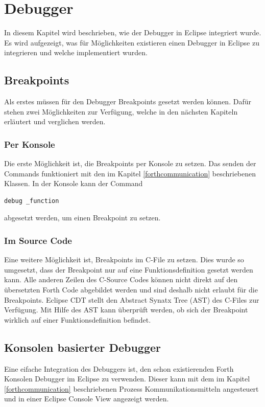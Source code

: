 \chapter{Debugger}
\label{chap:debugger}
In diesem Kapitel wird beschrieben, wie der Debugger in Eclipse integriert wurde. Es wird aufgezeigt, was für Möglichkeiten existieren einen Debugger in Eclipse zu integrieren und welche implementiert wurden.

\section{Breakpoints}
Als erstes müssen für den Debugger Breakpoints gesetzt werden können. Dafür stehen zwei Möglichkeiten zur Verfügung, welche in den nächsten Kapiteln erläutert und verglichen werden.

\subsection{Per Konsole}

Die erste Möglichkeit ist, die Breakpoints per Konsole zu setzen. Das senden der Commands funktioniert mit den im Kapitel \ref{forthcommunication} beschriebenen Klassen. In der Konsole kann der Command

%
\begin{verbatim}
debug _function
\end{verbatim}
%
abgesetzt werden, um einen Breakpoint zu setzen.

\subsection{Im Source Code}

Eine weitere Möglichkeit ist, Breakpoints im C-File zu setzen. Dies wurde so umgesetzt, dass der Breakpoint nur auf eine Funktionsdefinition gesetzt werden kann. Alle anderen Zeilen des C-Source Codes können nicht direkt auf den übersetzten Forth Code abgebildet werden und sind deshalb nicht erlaubt für die Breakpoints.
\newline
Eclipse CDT stellt den Abstract Synatx Tree (AST) des C-Files zur Verfügung. Mit Hilfe des AST kann überprüft werden, ob sich der Breakpoint wirklich auf einer Funktionsdefinition befindet.
\newpage
\section{Konsolen basierter Debugger}

Eine eifache Integration des Debuggers ist, den schon existierenden Forth Konsolen Debugger im Eclipse zu verwenden. Dieser kann mit dem im Kapitel \ref{forthcommunication} beschriebenen Prozess Kommunikationsmitteln angesteuert und in einer Eclipse Console View angezeigt werden.


